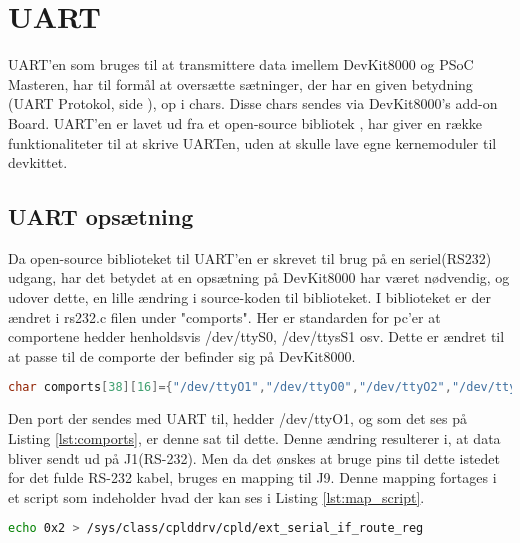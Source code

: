 \section{UART} \label{sec:UART_impl}

UART'en som bruges til at transmittere data imellem DevKit8000 og PSoC Masteren, har til formål at oversætte sætninger, der har en given betydning (UART Protokol, side \pageref{sec:UART_protokol}), op i chars. Disse chars sendes via DevKit8000's add-on Board.\cite{lib:DevKit8000_Addon}
UART'en er lavet ud fra et open-source bibliotek \cite{lib:DevKit8000_Addon} , har giver en række funktionaliteter til at skrive UARTen, uden at skulle lave egne kernemoduler til devkittet.

\subsection{UART opsætning} \label{sec:uart_impl_opsatning}

Da open-source biblioteket til UART'en er skrevet til brug på en seriel(RS232) udgang, har det betydet at en opsætning på DevKit8000 har været nødvendig, og udover dette, en lille ændring i source-koden til biblioteket. 
I biblioteket er der ændret i rs232.c filen under "comports". Her er standarden for pc'er at comportene hedder henholdsvis /dev/ttyS0, /dev/ttysS1 osv. Dette er ændret til at passe til de comporte der befinder sig på DevKit8000.

\clearpage

\begin{lstlisting}[language=C ,caption=Porte connect metoden vil forsøge at lave forbindelse på, label=lst:comports]
char comports[38][16]={"/dev/ttyO1","/dev/ttyO0","/dev/ttyO2","/dev/ttyS3","/dev/ttyS4","/dev/ttyS5","/dev/ttyS6","/dev/ttyS7","/dev/ttyS8","/dev/ttyS9","/dev/ttyS10","/dev/ttyS11",
\end{lstlisting}

Den port der sendes med UART til, hedder /dev/ttyO1, og som det ses på Listing \ref{lst:comports}, er denne sat til dette.
Denne ændring resulterer i, at data bliver sendt ud på J1(RS-232). Men da det ønskes at bruge pins til dette istedet for det fulde RS-232 kabel, bruges en mapping til J9. 
Denne mapping fortages i et script som indeholder hvad der kan ses i Listing \ref{lst:map_script}.

\begin{lstlisting}[language=bash ,caption=kommando til at mappe forbindelse fra J1 til J9 på addonboard, label=lst:map_script]
echo 0x2 > /sys/class/cplddrv/cpld/ext_serial_if_route_reg
\end{lstlisting}

